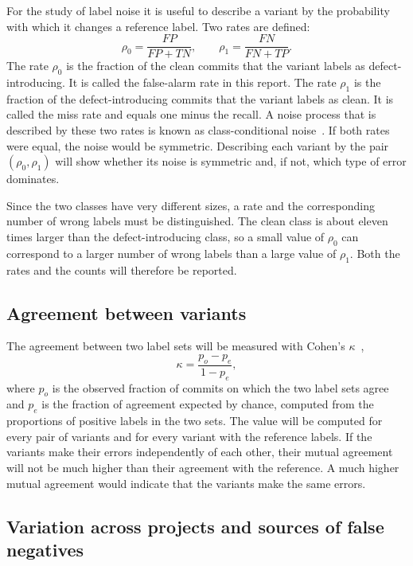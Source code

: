 \documentclass[12pt,a4paper,oneside]{report}
\newcommand{\rhoz}{\rho_0}
\newcommand{\rhoo}{\rho_1}
\begin{document}
For the study of label noise it is useful to describe a variant by the
probability with which it changes a reference label. Two rates are defined:
\begin{equation}
\rhoz = \frac{FP}{FP+TN}, \qquad \rhoo = \frac{FN}{FN+TP}.
\label{eq:rho}
\end{equation}
The rate $\rhoz$ is the fraction of the clean commits that the variant labels
as defect-introducing. It is called the false-alarm rate in this report. The
rate $\rhoo$ is the fraction of the defect-introducing commits that the
variant labels as clean. It is called the miss rate and equals one minus the
recall. A noise process that is described by these two rates is known as
class-conditional noise~\cite{natarajan2013noisy}. If both rates were equal,
the noise would be symmetric. Describing each variant by the pair
$(\rhoz,\rhoo)$ will show whether its noise is symmetric and, if not, which
type of error dominates.

Since the two classes have very different sizes, a rate and the corresponding
number of wrong labels must be distinguished. The clean class is about eleven
times larger than the defect-introducing class, so a small value of $\rhoz$
can correspond to a larger number of wrong labels than a large value of
$\rhoo$. Both the rates and the counts will therefore be reported.

\subsection{Agreement between variants}

The agreement between two label sets will be measured with Cohen's
$\kappa$~\cite{cohen1960kappa},
\begin{equation}
\kappa = \frac{p_o - p_e}{1 - p_e},
\end{equation}
where $p_o$ is the observed fraction of commits on which the two label sets
agree and $p_e$ is the fraction of agreement expected by chance, computed
from the proportions of positive labels in the two sets. The value will be
computed for every pair of variants and for every variant with the reference
labels. If the variants make their errors independently of each other, their
mutual agreement will not be much higher than their agreement with the
reference. A much higher mutual agreement would indicate that the variants
make the same errors.

\subsection{Variation across projects and sources of false negatives}
\end{document}
